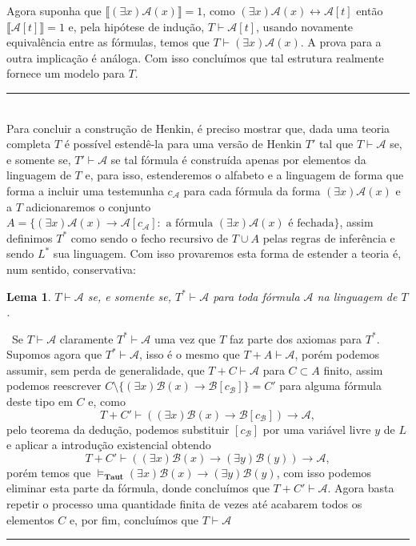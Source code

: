 \documentclass[11pt,a4paper]{article}
\newtheorem{lem}[mydef]{Lema}
\def\dem{\par\smallbreak\noindent {\textit{ Demonstração:}} \ }
\def\eop{\hfill\rule{2.5mm}{2.5mm} \\ }
\theoremstyle{definition}
\begin{document}
Agora suponha que  $\llbracket (\exists x)\mathscr{A}(x) \rrbracket=1$, como $(\exists x)\mathscr{A}(x)\leftrightarrow \mathscr{A}[t]$ então $\llbracket \mathscr{A}[t] \rrbracket=1$ e, pela hipótese de indução, $T\vdash \mathscr{A}[t]$, usando novamente equivalência entre as fórmulas, temos que $T\vdash (\exists x)\mathscr{A}(x)$. A prova para a outra implicação é análoga. Com isso concluímos que tal estrutura realmente fornece um modelo para $T$. \eop

Para concluir a construção de Henkin, é preciso mostrar que, dada uma teoria completa $T$ é possível estendê-la para uma versão de Henkin $T'$ tal que $T\vdash \mathscr{A}$ se, e somente se,  $T'\vdash \mathscr{A}$ se tal fórmula é construída apenas por elementos da linguagem de $T$ e, para isso, estenderemos o alfabeto e a linguagem de forma que forma a incluir uma testemunha $c_{\mathscr{A}}$ para cada fórmula da forma $(\exists x)\mathscr{A}(x)$ e a $T$ adicionaremos o conjunto $A=\{ (\exists x)\mathscr{A}(x)\rightarrow \mathscr{A}[c_{\mathscr{A}}] : \text{ a fórmula }  (\exists x)\mathscr{A}(x) \text{ é fechada}\}$, assim definimos $T^*$ como sendo o fecho recursivo de $T\cup A$ pelas regras de inferência e sendo $L^*$ sua linguagem. Com isso provaremos esta forma de estender a teoria é, num sentido, conservativa: 

\begin{lem}
	
	$T\vdash \mathscr{A}$ se, e somente se,  $T^*\vdash \mathscr{A}$ para toda fórmula $\mathscr{A}$ na linguagem de $T$.
	
\end{lem} 

\dem Se $T\vdash \mathscr{A}$ claramente  $T^*\vdash \mathscr{A}$ uma vez que $T$ faz parte dos axiomas para $T^*$. Supomos agora que  $T^*\vdash \mathscr{A}$, isso é o mesmo que $T+A\vdash \mathscr{A}$, porém podemos assumir, sem perda de generalidade, que $T+C\vdash \mathscr{A}$ para $C\subset A$ finito, assim podemos reescrever $C\setminus \{ (\exists x)\mathscr{B}(x)\rightarrow \mathscr{B}[c_{\mathscr{B}}] \}=C'$ para alguma fórmula deste tipo em $C$ e, como $$T+C'\vdash ((\exists x)\mathscr{B}(x)\rightarrow \mathscr{B}[c_{\mathscr{B}}])\rightarrow \mathscr{A},$$ pelo teorema da dedução, podemos substituir $[ c_{\mathscr{B}}]$ por uma variável livre $y$ de $L$ e aplicar a introdução existencial obtendo $$T+C'\vdash ((\exists x)\mathscr{B}(x)\rightarrow (\exists y)\mathscr{B}(y))\rightarrow \mathscr{A},$$ porém temos que $\vDash_{\textbf{Taut}} (\exists x)\mathscr{B}(x)\rightarrow (\exists y)\mathscr{B}(y)$, com isso podemos eliminar esta parte da fórmula, donde concluímos que $T+C'\vdash \mathscr{A}$. Agora basta repetir o processo uma quantidade finita de vezes até acabarem todos os elementos $C$ e, por fim, concluímos que $T\vdash \mathscr{A}$ \eop
\end{document}
